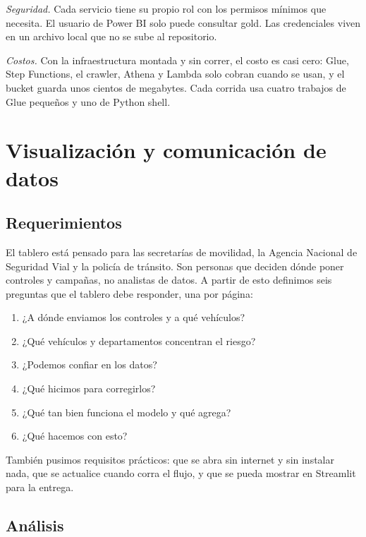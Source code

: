 \documentclass[11pt,a4paper]{article}
\begin{document}
\textit{Seguridad.} Cada servicio tiene su propio rol con los permisos mínimos que necesita. El usuario de Power BI solo puede consultar gold. Las credenciales viven en un archivo local que no se sube al repositorio.

\textit{Costos.} Con la infraestructura montada y sin correr, el costo es casi cero: Glue, Step Functions, el crawler, Athena y Lambda solo cobran cuando se usan, y el bucket guarda unos cientos de megabytes. Cada corrida usa cuatro trabajos de Glue pequeños y uno de Python shell.

\section{Visualización y comunicación de datos}\label{sec:visualizacion}

\subsection{Requerimientos}

El tablero está pensado para las secretarías de movilidad, la Agencia Nacional de Seguridad Vial y la policía de tránsito. Son personas que deciden dónde poner controles y campañas, no analistas de datos. A partir de esto definimos seis preguntas que el tablero debe responder, una por página:

\begin{enumerate}
  \item ¿A dónde enviamos los controles y a qué vehículos?
  \item ¿Qué vehículos y departamentos concentran el riesgo?
  \item ¿Podemos confiar en los datos?
  \item ¿Qué hicimos para corregirlos?
  \item ¿Qué tan bien funciona el modelo y qué agrega?
  \item ¿Qué hacemos con esto?
\end{enumerate}

También pusimos requisitos prácticos: que se abra sin internet y sin instalar nada, que se actualice cuando corra el flujo, y que se pueda mostrar en Streamlit para la entrega.

\subsection{Análisis}
\end{document}
